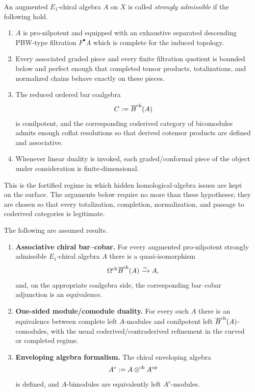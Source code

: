 \begin{definition}
An augmented $E_1$-chiral algebra $A$ on $X$ is called \emph{strongly admissible} if the following
hold.
\begin{enumerate}[label=(\alph*)]
\item $A$ is pro-nilpotent and equipped with an exhaustive separated descending PBW-type filtration
$F^\bullet A$ which is complete for the induced topology.

\item Every associated graded piece and every finite filtration quotient is bounded below and perfect
enough that completed tensor products, totalizations, and normalized chains behave exact\-ly on these
pieces.

\item The reduced ordered bar coalgebra
\[
C:=\overline{B}^{\mathrm{ch}}(A)
\]
is conilpotent, and the corresponding coderived category of bicomodules admits enough coflat
resolutions so that derived cotensor products are defined and associative.

\item Whenever linear duality is invoked, each graded/conformal piece of the object under consideration
is finite-dimensional.
\end{enumerate}
\end{definition}

\begin{remark}
This is the fortified regime in which hidden homological-algebra issues are kept on the surface.
The arguments below require no more than these hypotheses; they are chosen so that
every totalization, completion, normalization, and passage to coderived categories is legitimate.
\end{remark}

\begin{hypothesis}
The following are assumed results.
\begin{enumerate}[label=(I)]
\item \textbf{Associative chiral bar--cobar.}
For every augmented pro-nilpotent strongly admissible $E_1$-chiral algebra $A$ there is a
quasi-isomorphism
\[
\Omega^{\mathrm{ch}} \overline{B}^{\mathrm{ch}}(A)\xrightarrow{\sim} A,
\]
and, on the appropriate coalgebra side, the corresponding bar--cobar adjunction is an equivalence.

\item \textbf{One-sided module/comodule duality.}
For every such $A$ there is an equivalence between complete left $A$-modules and conilpotent left
$\overline{B}^{\mathrm{ch}}(A)$-comodules, with the usual coderived/contraderived refinement in the curved or completed
regime.

\item \textbf{Enveloping algebra formalism.}
The chiral enveloping algebra
\[
A^e := A\mathbin{\otimes^{\mathrm{ch}}} A^{\mathrm{op}}
\]
is defined, and $A$-bimodules are equivalently left $A^e$-modules.
\end{enumerate}
\end{hypothesis}


